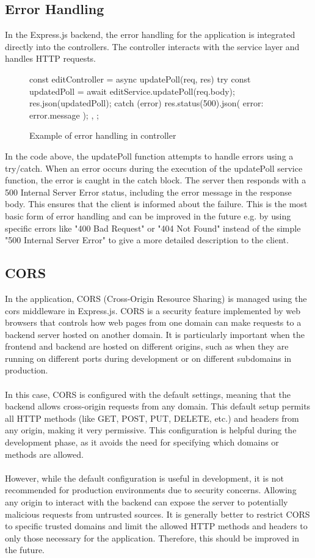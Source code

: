 \documentclass[a4paper,12pt]{report}
\begin{document}
\subsection{Error Handling}
In the Express.js backend, the error handling for the application is integrated directly into the controllers. The controller interacts with the service layer and handles HTTP requests. 
\begin{figure}[H]
	\begin{code}
		const editController = {
			async updatePoll(req, res) {
				try {
					const updatedPoll = await editService.updatePoll(req.body);
					res.json(updatedPoll);
				} catch (error) {
					res.status(500).json({ error: error.message });
				}
			},
		};
	\end{code}
	\caption{Example of error handling in controller}
	\label{fig:controller-err}
\end{figure}
In the code above, the updatePoll function attempts to handle errors using a try/catch. When an error occurs during the execution of the updatePoll service function, the error is caught in the catch block. The server then responds with a 500 Internal Server Error status, including the error message in the response body. This ensures that the client is informed about the failure. This is the most basic form of error handling and can be improved in the future e.g. by using specific errors like "400 Bad Request" or "404 Not Found" instead of the simple "500 Internal Server Error" to give a more detailed description to the client. 
\subsection{CORS}
In the application, CORS (Cross-Origin Resource Sharing) is managed using the cors middleware in Express.js. CORS is a security feature implemented by web browsers that controls how web pages from one domain can make requests to a backend server hosted on another domain. It is particularly important when the frontend and backend are hosted on different origins, such as when they are running on different ports during development or on different subdomains in production. \\ \\
In this case, CORS is configured with the default settings, meaning that the backend allows cross-origin requests from any domain. This default setup permits all HTTP methods (like GET, POST, PUT, DELETE, etc.) and headers from any origin, making it very permissive. This configuration is helpful during the development phase, as it avoids the need for specifying which domains or methods are allowed. \\ \\
However, while the default configuration is useful in development, it is not recommended for production environments due to security concerns. Allowing any origin to interact with the backend can expose the server to potentially malicious requests from untrusted sources. It is generally better to restrict CORS to specific trusted domains and limit the allowed HTTP methods and headers to only those necessary for the application. Therefore, this should be improved in the future. \cite{mdn-cors}
\end{document}

